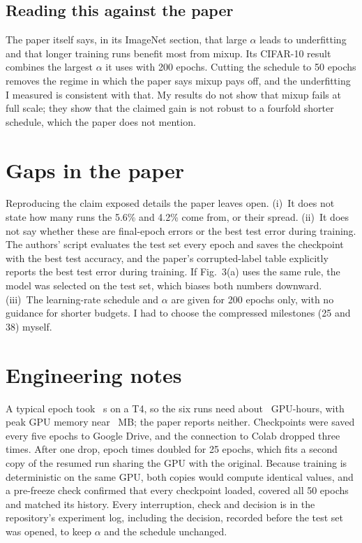 \documentclass[conference]{IEEEtran}
\begin{document}
\subsection{Reading this against the paper}
The paper itself says, in its ImageNet section, that large $\alpha$ leads to underfitting and that
longer training runs benefit most from mixup. Its CIFAR-10 result combines the largest $\alpha$ it
uses with 200 epochs. Cutting the schedule to 50 epochs removes the regime in which the paper says
mixup pays off, and the underfitting I measured is consistent with that. My results do not show that
mixup fails at full scale; they show that the claimed gain is not robust to a fourfold shorter
schedule, which the paper does not mention.

\section{Gaps in the paper}
\label{sec:gaps}
Reproducing the claim exposed details the paper leaves open. (i)~It does not state how many runs
the 5.6\% and 4.2\% come from, or their spread. (ii)~It does not say whether these are final-epoch
errors or the best test error during training. The authors' script evaluates the test set every
epoch and saves the checkpoint with the best test accuracy, and the paper's corrupted-label table
explicitly reports the best test error during training. If Fig.~3(a) uses the same rule, the model
was selected on the test set, which biases both numbers downward. (iii)~The learning-rate schedule
and $\alpha$ are given for 200 epochs only, with no guidance for shorter budgets. I had to choose
the compressed milestones (25 and 38) myself.

\section{Engineering notes}
A typical epoch took \EpochSeconds~s on a T4, so the six runs need about \GpuHours~GPU-hours, with peak
GPU memory near \PeakGpuMB~MB; the paper reports neither. Checkpoints were saved every five epochs
to Google Drive, and the connection to Colab dropped three times. After one drop, epoch times
doubled for 25 epochs, which fits a second copy of the resumed run sharing the GPU with the
original. Because training is deterministic on the same GPU, both copies would compute identical
values, and a pre-freeze check
confirmed that every checkpoint loaded, covered all 50 epochs and matched its history. Every
interruption, check and decision is in the repository's experiment log, including the decision,
recorded before the test set was opened, to keep $\alpha$ and the schedule unchanged.
\end{document}
